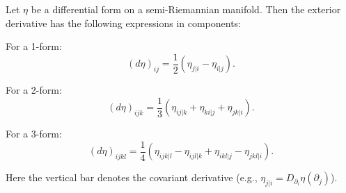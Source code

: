 Let $\eta$ be a differential form on a semi-Riemannian manifold. Then the exterior derivative has the following expressions in components:

For a 1-form:
$$(d\eta)_{ij} = \frac{1}{2}(\eta_{j|i} - \eta_{i|j}).$$

For a 2-form:
$$(d\eta)_{ijk} = \frac{1}{3}(\eta_{ij|k} + \eta_{ki|j} + \eta_{jk|i}).$$

For a 3-form:
$$(d\eta)_{ijkl} = \frac{1}{4}(\eta_{ijk|l} - \eta_{ijl|k} + \eta_{ikl|j} - \eta_{jkl|i}).$$

Here the vertical bar denotes the covariant derivative (e.g., $\eta_{j|i} = D_{\partial_i} \eta(\partial_j)$).
